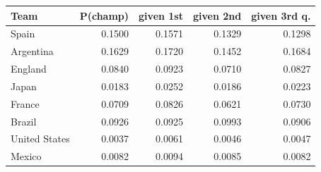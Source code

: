 \begin{tabular}{lrrrr}
\toprule
Team & P(champ) & given 1st & given 2nd & given 3rd q. \\
\midrule
Spain & 0.1500 & 0.1571 & 0.1329 & 0.1298 \\
Argentina & 0.1629 & 0.1720 & 0.1452 & 0.1684 \\
England & 0.0840 & 0.0923 & 0.0710 & 0.0827 \\
Japan & 0.0183 & 0.0252 & 0.0186 & 0.0223 \\
France & 0.0709 & 0.0826 & 0.0621 & 0.0730 \\
Brazil & 0.0926 & 0.0925 & 0.0993 & 0.0906 \\
United States & 0.0037 & 0.0061 & 0.0046 & 0.0047 \\
Mexico & 0.0082 & 0.0094 & 0.0085 & 0.0082 \\
\bottomrule
\end{tabular}

